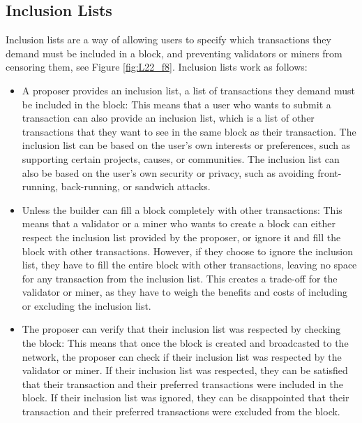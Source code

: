 \subsection{Inclusion Lists}
Inclusion lists are a way of allowing users to specify which transactions they demand must be included in a block, and preventing validators or miners from censoring them, see Figure \ref{fig:L22_f8}. Inclusion lists work as follows:\\
\begin{itemize}
	\item A proposer provides an inclusion list, a list of transactions they demand must be included in the block: This means that a user who wants to submit a transaction can also provide an inclusion list, which is a list of other transactions that they want to see in the same block as their transaction. The inclusion list can be based on the user’s own interests or preferences, such as supporting certain projects, causes, or communities. The inclusion list can also be based on the user’s own security or privacy, such as avoiding front-running, back-running, or sandwich attacks.
	\item Unless the builder can fill a block completely with other transactions: This means that a validator or a miner who wants to create a block can either respect the inclusion list provided by the proposer, or ignore it and fill the block with other transactions. However, if they choose to ignore the inclusion list, they have to fill the entire block with other transactions, leaving no space for any transaction from the inclusion list. This creates a trade-off for the validator or miner, as they have to weigh the benefits and costs of including or excluding the inclusion list.
	\item The proposer can verify that their inclusion list was respected by checking the block: This means that once the block is created and broadcasted to the network, the proposer can check if their inclusion list was respected by the validator or miner. If their inclusion list was respected, they can be satisfied that their transaction and their preferred transactions were included in the block. If their inclusion list was ignored, they can be disappointed that their transaction and their preferred transactions were excluded from the block.
\end{itemize}
